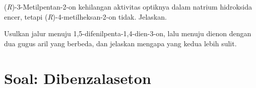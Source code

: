 \begin{exercise}[$\star\star\star$]\label{exo:b2:enolates-aldol:11}
(\textit{R})-3-Metilpentan-2-on kehilangan aktivitas optiknya dalam natrium
hidroksida encer, tetapi (\textit{R})-4-metilheksan-2-on tidak. Jelaskan.
\end{exercise}

\begin{exercise}[$\star\star\star$]\label{exo:b2:enolates-aldol:12}
Usulkan jalur menuju 1,5-difenilpenta-1,4-dien-3-on, lalu menuju dienon
dengan dua gugus aril yang berbeda, dan jelaskan mengapa yang kedua lebih
sulit.
\end{exercise}

\section{Soal: Dibenzalaseton}

